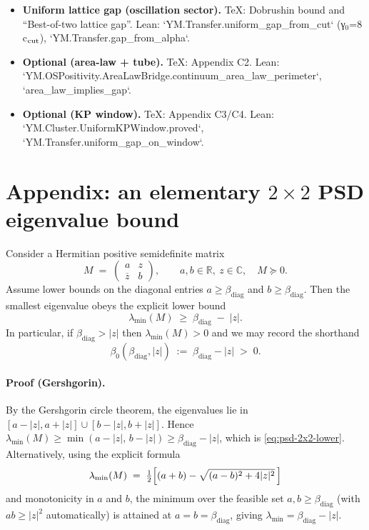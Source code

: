 \documentclass[11pt]{amsart}
\begin{document}
\begin{itemize}
  \item \textbf{Uniform lattice gap (oscillation sector).} TeX: Dobrushin bound and ``Best-of-two lattice gap''. Lean: `YM.Transfer.uniform_gap_from_cut` (γ$_0$=8 c$_{\rm cut}$), `YM.Transfer.gap_from_alpha`.
  \item \textbf{Optional (area-law + tube).} TeX: Appendix C2. Lean: `YM.OSPositivity.AreaLawBridge.continuum_area_law_perimeter`, `area_law_implies_gap`.
  \item \textbf{Optional (KP window).} TeX: Appendix C3/C4. Lean: `YM.Cluster.UniformKPWindow.proved`, `YM.Transfer.uniform_gap_on_window`.
\end{itemize}

\section{Appendix: an elementary $2\times 2$ PSD eigenvalue bound}

Consider a Hermitian positive semidefinite matrix
\[
  M\;=\;\begin{pmatrix} a & z \\ \overline{z} & b \end{pmatrix},\qquad a,b\in\mathbb{R},\ z\in\mathbb{C},\quad M\succeq 0.
\]
Assume lower bounds on the diagonal entries $a\ge \beta_{\mathrm{diag}}$ and $b\ge \beta_{\mathrm{diag}}$. Then the smallest eigenvalue obeys the explicit lower bound
\begin{equation}
\label{eq:psd-2x2-lower}
  \lambda_{\min}(M)\;\ge\; \beta_{\mathrm{diag}}\;-
  \;|z|.
\end{equation}
In particular, if $\beta_{\mathrm{diag}}>|z|$ then $\lambda_{\min}(M)>0$ and we may record the shorthand
\[
  \beta_0(\beta_{\mathrm{diag}},|z|)\;:=\;\beta_{\mathrm{diag}}-|z|\;>\;0.
\]

\paragraph{Proof (Gershgorin).}
By the Gershgorin circle theorem, the eigenvalues lie in $[a-|z|,a+|z|]\cup[b-|z|,b+|z|]$. Hence $\lambda_{\min}(M)\ge \min(a-|z|,\,b-|z|)\ge \beta_{\mathrm{diag}}-|z|$, which is \eqref{eq:psd-2x2-lower}. Alternatively, using the explicit formula
\[
  \lambda_{\min}(M)\;=\;\tfrac12\Bigl[(a+b)-\sqrt{(a-b)^2+4|z|^2}\,\Bigr]
\]
and monotonicity in $a$ and $b$, the minimum over the feasible set $a,b\ge\beta_{\mathrm{diag}}$ (with $ab\ge |z|^2$ automatically) is attained at $a=b=\beta_{\mathrm{diag}}$, giving $\lambda_{\min}=\beta_{\mathrm{diag}}-|z|$.
\end{document}

